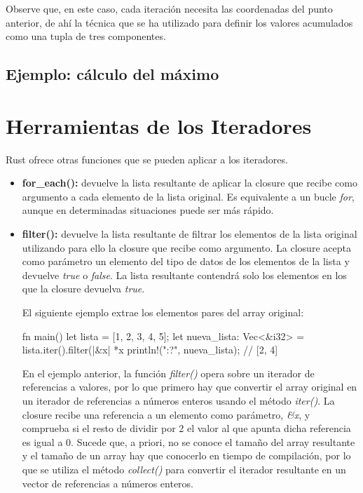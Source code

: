 Observe que, en este caso, cada iteración necesita las coordenadas del punto anterior, de ahí la técnica que se ha utilizado para definir los valores acumulados como una tupla de tres componentes.




\subsection{Ejemplo: cálculo del máximo}


\section{Herramientas de los Iteradores}
\noindent Rust ofrece otras funciones que se pueden aplicar a los iteradores. 

\begin{itemize}
   \item \textbf{for\_each():} devuelve la lista resultante de aplicar la closure que recibe como argumento a cada elemento de la lista original. Es equivalente a un bucle \textit{for}, aunque en determinadas situaciones puede ser más rápido.
   
   \item \textbf{filter():} devuelve la lista resultante de filtrar los elementos de la lista original utilizando para ello la closure que recibe como argumento. La closure acepta como parámetro un elemento del tipo de datos de los elementos de la lista y devuelve \textit{true} o \textit{false}. La lista resultante contendrá solo los elementos en los que la closure devuelva \textit{true}.
   
   El siguiente ejemplo extrae los elementos pares del array original:
   \vspace{0.7em}
   \begin{Codigo}
      fn main() {
         let lista = [1, 2, 3, 4, 5];
         let nueva_lista: Vec<&i32> = lista.iter().filter(|&x| *x%
         println!("{:?}", nueva_lista); // [2, 4]
      }
   \end{Codigo}
   En el ejemplo anterior, la función \textit{filter()} opera sobre un iterador de referencias a valores, por lo que primero hay que convertir el array original en un iterador de referencias a números enteros usando el método \textit{iter()}. La closure recibe una referencia a un elemento como parámetro, \textit{\&x}, y comprueba si el resto de dividir por 2 el valor al que apunta dicha referencia es igual a 0. Sucede que, a priori, no se conoce el tamaño del array resultante y el tamaño de un array hay que conocerlo en tiempo de compilación, por lo que se utiliza el método \textit{collect()} para convertir el iterador resultante en un vector de referencias a números enteros.  
   
   
   
   \vspace{0.7em}
   \begin{Codigo}
      
   \end{Codigo}
\end{itemize}



